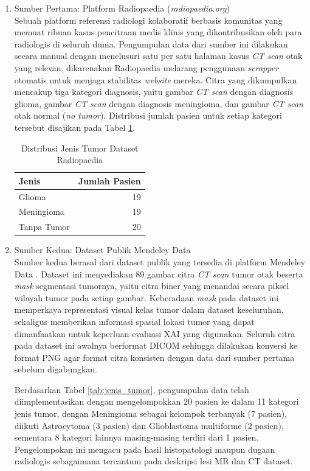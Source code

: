 \begin{enumerate}
	\item Sumber Pertama: Platform Radiopaedia (\textit{radiopaedia.org})\\
	Sebuah platform referensi radiologi kolaboratif berbasis komunitas yang memuat ribuan kasus pencitraan medis klinis yang dikontribusikan oleh para radiologis di seluruh dunia. Pengumpulan data dari sumber ini dilakukan secara manual dengan menelusuri satu per satu halaman kasus \textit{CT scan} otak yang relevan, dikarenakan Radiopaedia melarang penggunaan \textit{scrapper} otomatis untuk menjaga stabilitas \textit{website} mereka. Citra yang dikumpulkan mencakup tiga kategori diagnosis, yaitu gambar \textit{CT scan} dengan diagnosis glioma, gambar \textit{CT scan} dengan diagnosis meningioma, dan gambar \textit{CT scan} otak normal (\textit{no tumor}). Distribusi jumlah pasien untuk setiap kategori tersebut disajikan pada Tabel \ref{tab:jenis_tumor_kedua}.
	
	\begin{table}[h]
		\centering
		\caption{Distribusi Jenis Tumor Dataset Radiopaedia}
		\label{tab:jenis_tumor_kedua}
		\begin{tabular}{|l|r|}
			\hline
			\textbf{Jenis} & \textbf{Jumlah Pasien} \\ \hline
			Glioma & 19 \\ \hline
			Meningioma & 19 \\ \hline
			Tanpa Tumor & 20 \\ \hline
		\end{tabular}
	\end{table}
	
	\item Sumber Kedua: Dataset Publik Mendeley Data\\
	Sumber kedua berasal dari dataset publik yang tersedia di platform Mendeley Data \cite{AlKadi2022Unpaired}. Dataset ini menyediakan 89 gambar citra \textit{CT scan} tumor otak beserta \textit{mask} segmentasi tumornya, yaitu citra biner yang menandai secara piksel wilayah tumor pada setiap gambar. Keberadaan \textit{mask} pada dataset ini memperkaya representasi visual kelas tumor dalam dataset keseluruhan, sekaligus memberikan informasi spasial lokasi tumor yang dapat dimanfaatkan untuk keperluan evaluasi XAI yang digunakan. Seluruh citra pada dataset ini awalnya berformat DICOM sehingga dilakukan konversi ke format PNG agar format citra konsisten dengan data dari sumber pertama sebelum digabungkan.
	
	Berdasarkan Tabel \ref{tab:jenis_tumor}, pengumpulan data telah diimplementasikan dengan mengelompokkan 20 pasien ke dalam 11 kategori jenis tumor, dengan Meningioma sebagai kelompok terbanyak (7 pasien), diikuti Astrocytoma (3 pasien) dan Glioblastoma multiforme (2 pasien), sementara 8 kategori lainnya masing-masing terdiri dari 1 pasien. Pengelompokan ini mengacu pada hasil histopatologi maupun dugaan radiologis sebagaimana tercantum pada deskripsi lesi MR dan CT dataset.
	

\end{enumerate}
